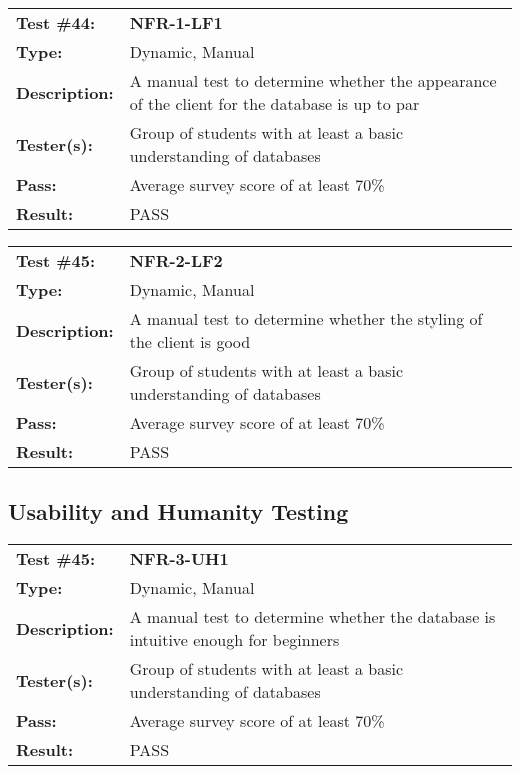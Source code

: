 \documentclass[12pt, titlepage]{article}
\begin{document}
\begin{mdframed}[linewidth=1pt]
\begin{tabularx}{\textwidth}{@{}p{3cm}X@{}}
{\bf Test \#44:} & {\bf NFR-1-LF1}\\[\baselineskip]
{\bf Type:} & Dynamic, Manual \\[0.5\baselineskip]
{\bf Description:} & A manual test to determine whether the appearance of the client for the database is up to par \\[\baselineskip]
{\bf Tester(s):} & Group of students with at least a basic understanding of databases \\[\baselineskip]
{\bf Pass:} & Average survey score of at least 70\% \\[\baselineskip]
{\bf Result:} & PASS
\end{tabularx}
\end{mdframed}

\begin{mdframed}[linewidth=1pt]
\begin{tabularx}{\textwidth}{@{}p{3cm}X@{}}
{\bf Test \#45:} & {\bf NFR-2-LF2}\\[\baselineskip]
{\bf Type:} & Dynamic, Manual \\[0.5\baselineskip]
{\bf Description:} & A manual test to determine whether the styling of the client is good  \\[\baselineskip]
{\bf Tester(s):} & Group of students with at least a basic understanding of databases \\[\baselineskip]
{\bf Pass:} & Average survey score of at least 70\% \\[\baselineskip]
{\bf Result:} & PASS
\end{tabularx}
\end{mdframed}

\subsection{Usability and Humanity Testing}

\begin{mdframed}[linewidth=1pt]
\begin{tabularx}{\textwidth}{@{}p{3cm}X@{}}
{\bf Test \#45:} & {\bf NFR-3-UH1}\\[\baselineskip]
{\bf Type:} & Dynamic, Manual \\[0.5\baselineskip]
{\bf Description:} & A manual test to determine whether the database is intuitive enough for beginners \\[\baselineskip]
{\bf Tester(s):} & Group of students with at least a basic understanding of databases \\[\baselineskip]
{\bf Pass:} & Average survey score of at least 70\% \\[\baselineskip]
{\bf Result:} & PASS
\end{tabularx}
\end{mdframed}
\end{document}
